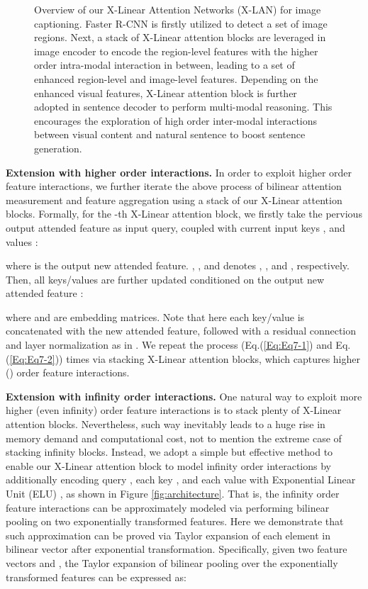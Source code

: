 \documentclass[10pt,twocolumn,letterpaper]{article}
\begin{document}
\begin{figure*}[!tb]
\vspace{-0.2in}
    \vspace{-0.06in}
    \caption{Overview of our X-Linear Attention Networks (X-LAN) for image captioning. Faster R-CNN is firstly utilized to detect a set of image regions. Next, a stack of X-Linear attention blocks are leveraged in image encoder to encode the region-level features with the higher order intra-modal interaction in between, leading to a set of enhanced region-level and image-level features. Depending on the enhanced visual features, X-Linear attention block is further adopted in sentence decoder to perform multi-modal reasoning. This encourages the exploration of high order inter-modal interactions between visual content and natural sentence to boost sentence generation.}
    \label{fig:framework}
    \vspace{-0.2in}
\end{figure*}

\textbf{Extension with higher order interactions.}
In order to exploit higher order feature interactions, we further iterate the above process of bilinear attention measurement and feature aggregation using a stack of our X-Linear attention blocks. Formally, for the -th X-Linear attention block, we firstly take the pervious output attended feature  as input query, coupled with current input keys , and values :

where  is the output new attended feature. , , and  denotes , , and , respectively. Then, all keys/values are further updated conditioned on the output new attended feature :

where  and  are embedding matrices. Note that here each key/value is concatenated with the new attended feature, followed with a residual connection and layer normalization as in \cite{vaswani2017attention}. We repeat the process (Eq.(\ref{Eq:Eq7-1}) and Eq.(\ref{Eq:Eq7-2}))  times via stacking  X-Linear attention blocks, which captures higher () order feature interactions.

\textbf{Extension with infinity order interactions.}
One natural way to exploit more higher (even infinity) order feature interactions is to stack plenty of X-Linear attention blocks. Nevertheless, such way inevitably leads to a huge rise in memory demand and computational cost, not to mention the extreme case of stacking infinity blocks. Instead, we adopt a simple but effective method to enable our X-Linear attention block to model infinity order interactions by additionally encoding query , each key , and each value  with Exponential Linear Unit (ELU) \cite{barron2017continuously}, as shown in Figure \ref{fig:architecture}. That is, the infinity order feature interactions can be approximately modeled via performing bilinear pooling on two exponentially transformed features. Here we demonstrate that such approximation can be proved via Taylor expansion of each element in bilinear vector after exponential transformation. Specifically, given two feature vectors  and , the Taylor expansion of bilinear pooling over the exponentially transformed features can be expressed as:
\end{document}
